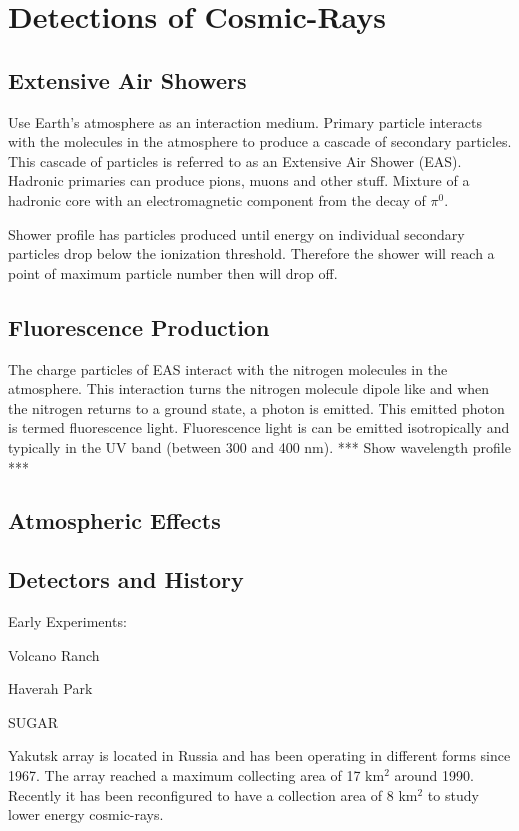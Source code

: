 \chapter{Detections of Cosmic-Rays}\label{Ch:CR_Detection}

\section{Extensive Air Showers}

Use Earth's atmosphere as an interaction medium.
Primary particle interacts with the molecules in the atmosphere to produce a cascade of secondary particles. This cascade of particles is referred to as an Extensive Air Shower (EAS).
Hadronic primaries can produce pions, muons and other stuff.
Mixture of a hadronic core with an electromagnetic component from the decay of $\pi^{0}$.

Shower profile has particles produced until energy on individual secondary particles drop below the ionization threshold. Therefore the shower will reach a point of maximum particle number then will drop off.

\section{Fluorescence Production}

The charge particles of EAS interact with the nitrogen molecules in the atmosphere. This interaction turns the nitrogen molecule dipole like and when the nitrogen returns to a ground state, a photon is emitted. This emitted photon is termed fluorescence light. Fluorescence light is can be emitted isotropically and typically in the UV band (between 300 and 400 nm). *** Show wavelength profile ***


\section{Atmospheric Effects}




\section{Detectors and History}

Early Experiments:

Volcano Ranch

Haverah Park

SUGAR

Yakutsk array is located in Russia and has been operating in different forms since 1967. The array reached a maximum collecting area of 17 km$^2$ around 1990. Recently it has been reconfigured to have a collection area of 8 km$^2$ to study lower energy cosmic-rays.

